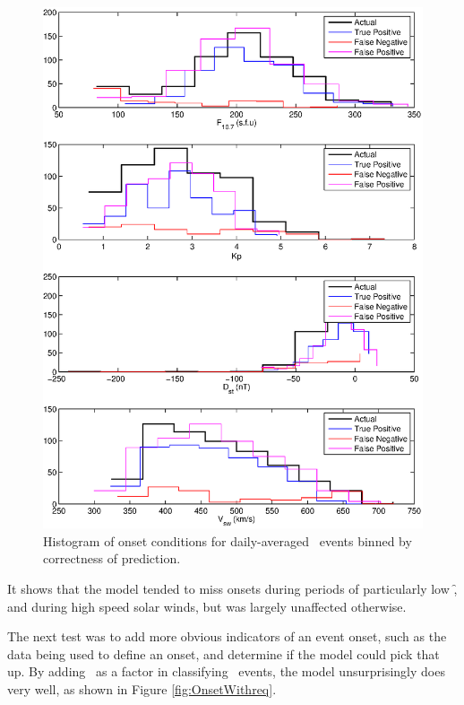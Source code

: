 \begin{figure}[htp!]
	\centering
	\includegraphics[width=0.85\linewidth]{Figures/CH5/NNBinaryOnset-daily-hist.eps}
	\caption{Histogram of onset conditions for daily-averaged \req\ events binned by correctness of prediction.}
	\label{fig:OnsetEventsHist}
\end{figure}

It shows that the model tended to miss onsets during periods of particularly low \f, and during high speed solar winds, but was largely unaffected otherwise.

The next test was to add more obvious indicators of an event onset, such as the data being used to define an onset, and determine if the model could pick that up. By adding \req\ as a factor in classifying \req\ events, the model unsurprisingly does very well, as shown in Figure \ref{fig:OnsetWithreq}.


